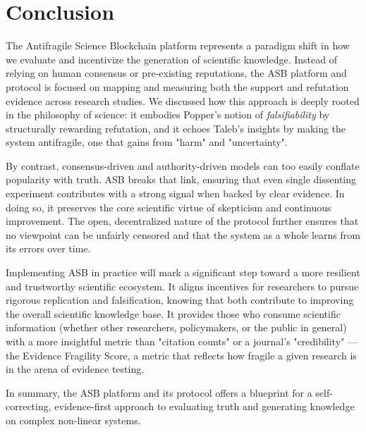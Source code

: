 \section{Conclusion}
The Antifragile Science Blockchain platform represents a paradigm shift in how we evaluate and incentivize the generation of scientific knowledge. Instead of relying on human consensus or pre-existing reputations, the ASB platform and protocol is focused on mapping and measuring both the support and refutation evidence across research studies. We discussed how this approach is deeply rooted in the philosophy of science: it embodies Popper's notion of \emph{falsifiability} by structurally rewarding refutation, and it echoes Taleb's insights by making the system antifragile, one that gains from "harm" and "uncertainty".

By contrast, consensus-driven and authority-driven models can too easily conflate popularity with truth. ASB breaks that link, ensuring that even single dissenting experiment contributes with a strong signal when backed by clear evidence. In doing so, it preserves the core scientific virtue of skepticism and continuous improvement. The open, decentralized nature of the protocol further ensures that no viewpoint can be unfairly censored and that the system as a whole learns from its errors over time.

Implementing ASB in practice will mark a significant step toward a more resilient and trustworthy scientific ecosystem. It aligns incentives for researchers to pursue rigorous replication and falsification, knowing that both contribute to improving the overall scientific knowledge base. It provides those who consume scientific information (whether other researchers, policymakers, or the public in general) with a more insightful metric than "citation counts" or a journal's "credibility" — the Evidence Fragility Score, a metric that reflects how fragile a given research is in the arena of evidence testing.

In summary, the ASB platform and its protocol offers a blueprint for a self-correcting, evidence-first approach to evaluating truth and generating knowledge on complex non-linear systems.
